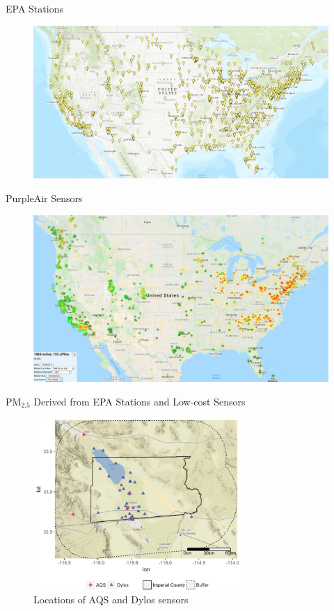 \documentclass[handout]{beamer} %
\begin{document}
\begin{frame}{EPA Stations}
    \begin{figure}
        \centering
        \includegraphics[width=\textwidth]{img/appendix/Aim2/Stations/epa.jpg}
    \end{figure}
\end{frame}

\begin{frame}{PurpleAir Sensors}
    \begin{figure}
        \centering
        \includegraphics[width=\textwidth]{img/appendix/Aim2/Stations/purpleair.jpg}
    \end{figure}
\end{frame}

\begin{frame}{PM$_{2.5}$ Derived from EPA Stations and Low-cost Sensors}
    \begin{figure}
        \centering
        \includegraphics[width=0.7\textwidth]{img/appendix/Aim2/im_location.png}
        \caption{Locations of AQS and Dylos sensors}
    \end{figure}
\end{frame}
\end{document}
